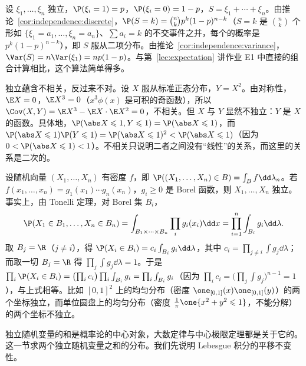 \begin{example}[二项分布的方差]
设 $\xi_1,\dots,\xi_n$ 独立，$\P(\xi_i=1)=p$，$\P(\xi_i=0)=1-p$，$S=\xi_1+\cdots+\xi_n$。由推论~\ref{cor:independence:discrete}，$\P(S=k)=\binom nkp^k(1-p)^{n-k}$（$S=k$ 是 $\binom nk$ 个形如 $\{\xi_1=a_1,\dots,\xi_n=a_n\}$、$\sum a_i=k$ 的不交事件之并，每个的概率是 $p^k(1-p)^{n-k}$），即 $S$ 服从二项分布。由推论~\ref{cor:independence:variance}，$\Var(S)=n\Var(\xi_1)=np(1-p)$。与第~\ref{lec:expectation} 讲作业 E1 中直接的组合计算相比，这个算法简单得多。
\end{example}

\begin{example}[不相关但不独立]\label{ex:independence:uncorrelated}
独立蕴含不相关，反过来不对。设 $X$ 服从标准正态分布，$Y=X^2$。由对称性，$\E X=0$，$\E X^3=0$（$x^3\phi(x)$ 是可积的奇函数），所以 $\Cov(X,Y)=\E X^3-\E X\cdot \E X^2=0$，不相关。但 $X$ 与 $Y$ 显然不独立：$Y$ 是 $X$ 的函数。具体地，$\P(\abs X\leqslant1,Y\leqslant1)=\P(\abs X\leqslant1)$，而 $\P(\abs X\leqslant1)\P(Y\leqslant1)=\P(\abs X\leqslant1)^2<\P(\abs X\leqslant1)$（因为 $0<\P(\abs X\leqslant1)<1$）。不相关只说明二者之间没有“线性”的关系，而这里的关系是二次的。
\end{example}

\begin{example}[有密度的情形]\label{ex:independence:density}
设随机向量 $(X_1,\dots,X_n)$ 有密度 $f$，即 $\P((X_1,\dots,X_n)\in B)=\int_Bf\dd\lambda_n$。若 $f(x_1,\dots,x_n)=g_1(x_1)\cdots g_n(x_n)$，$g_i\geqslant0$ 是 Borel 函数，则 $X_1,\dots,X_n$ 独立。事实上，由 Tonelli 定理，对 Borel 集 $B_i$，
\[
\P(X_1\in B_1,\dots,X_n\in B_n)=\int_{B_1\times\cdots\times B_n}\prod_ig_i(x_i)\dd x=\prod_{i=1}^n\int_{B_i}g_i\dd\lambda .
\]
取 $B_j=\R$（$j\neq i$），得 $\P(X_i\in B_i)=c_i\int_{B_i}g_i\dd\lambda$，其中 $c_i=\prod_{j\neq i}\int g_j\dd\lambda$；而取一切 $B_j=\R$ 得 $\prod_j\int g_j\dd\lambda=1$。于是 $\prod_i\P(X_i\in B_i)=\bigl(\prod_ic_i\bigr)\prod_i\int_{B_i}g_i=\prod_i\int_{B_i}g_i$（因为 $\prod_ic_i=\bigl(\prod_j\int g_j\bigr)^{n-1}=1$），与上式相等。比如 $[0,1]^2$ 上的均匀分布（密度 $\one_{[0,1]}(x)\one_{[0,1]}(y)$）的两个坐标独立，而单位圆盘上的均匀分布（密度 $\frac1\pi\one\{x^2+y^2\leqslant1\}$，不能分解）的两个坐标不独立。
\end{example}


独立随机变量的和是概率论的中心对象，大数定律与中心极限定理都是关于它的。这一节求两个独立随机变量之和的分布。我们先说明 Lebesgue 积分的平移不变性。

